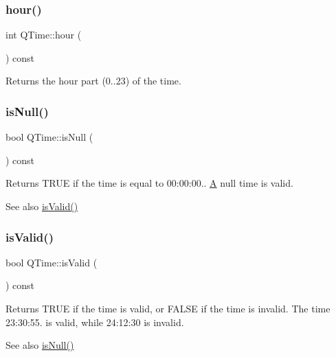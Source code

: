 \subsubsection{\texorpdfstring{hour()}{hour()}}
{\footnotesize\ttfamily int Q\+Time\+::hour (\begin{DoxyParamCaption}{ }\end{DoxyParamCaption}) const}

Returns the hour part (0..23) of the time. \mbox{\label{class_q_time_a05bdf71ae9a3fd858f48cafd94f31240}} 
\subsubsection{\texorpdfstring{isNull()}{isNull()}}
{\footnotesize\ttfamily bool Q\+Time\+::is\+Null (\begin{DoxyParamCaption}{ }\end{DoxyParamCaption}) const\hspace{0.3cm}{\ttfamily [inline]}}

Returns T\+R\+UE if the time is equal to 00\+:00\+:00.. \mbox{\hyperlink{class_a}{A}} null time is valid.

\begin{DoxySeeAlso}{See also}
\mbox{\hyperlink{class_q_time_a4f54e1193a12519a7bd9efb7ea16fdca}{is\+Valid()}} 
\end{DoxySeeAlso}
\mbox{\label{class_q_time_a4f54e1193a12519a7bd9efb7ea16fdca}} 
\subsubsection{\texorpdfstring{isValid()}{isValid()}\hspace{0.1cm}{\footnotesize\ttfamily [1/2]}}
{\footnotesize\ttfamily bool Q\+Time\+::is\+Valid (\begin{DoxyParamCaption}{ }\end{DoxyParamCaption}) const}

Returns T\+R\+UE if the time is valid, or F\+A\+L\+SE if the time is invalid. The time 23\+:30\+:55. is valid, while 24\+:12\+:30 is invalid.

\begin{DoxySeeAlso}{See also}
\mbox{\hyperlink{class_q_time_a05bdf71ae9a3fd858f48cafd94f31240}{is\+Null()}} 
\end{DoxySeeAlso}
\mbox{\label{class_q_time_ac4290605812fb2c716e443bbe0409f60}} 

